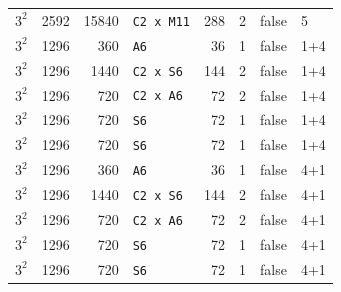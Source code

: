 \begin{longtable}{llrlrrll}
$3^2$ & 2592 & 15840 & \texttt{C2 x M11} & 288 & 2 & false & 5\\
$3^2$ & 1296 & 360 & \texttt{A6} & 36 & 1 & false & 1+4\\
$3^2$ & 1296 & 1440 & \texttt{C2 x S6} & 144 & 2 & false & 1+4\\
$3^2$ & 1296 & 720 & \texttt{C2 x A6} & 72 & 2 & false & 1+4\\
$3^2$ & 1296 & 720 & \texttt{S6} & 72 & 1 & false & 1+4\\
$3^2$ & 1296 & 720 & \texttt{S6} & 72 & 1 & false & 1+4\\
$3^2$ & 1296 & 360 & \texttt{A6} & 36 & 1 & false & 4+1\\
$3^2$ & 1296 & 1440 & \texttt{C2 x S6} & 144 & 2 & false & 4+1\\
$3^2$ & 1296 & 720 & \texttt{C2 x A6} & 72 & 2 & false & 4+1\\
$3^2$ & 1296 & 720 & \texttt{S6} & 72 & 1 & false & 4+1\\
$3^2$ & 1296 & 720 & \texttt{S6} & 72 & 1 & false & 4+1\\
\end{longtable}
